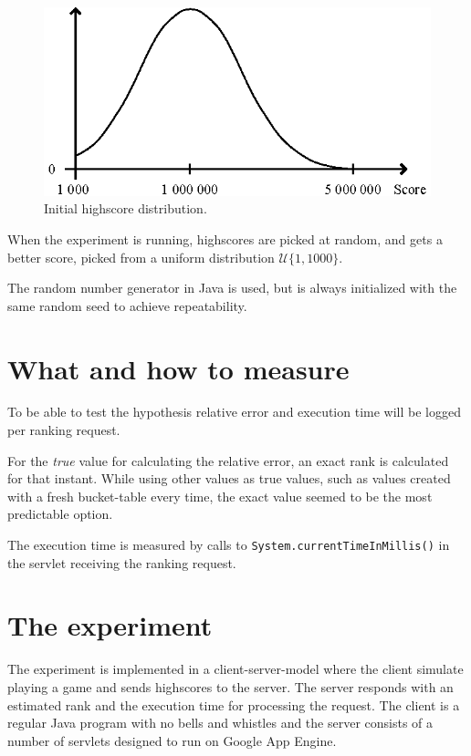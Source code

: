 \begin{figure}[h]
  \centering
  \caption{Initial highscore distribution.}
  \label{fig:highscore-distribution}
  \includegraphics[width=13cm]{img/highscore-distribution.eps}
\end{figure} 

When the experiment is running, highscores are picked at random, and gets a better score, picked from a uniform distribution $\mathcal{U}\{1, 1000\}$.

The random number generator in Java is used, but is always initialized with the same random seed to achieve repeatability.  

\section{What and how to measure}

To be able to test the hypothesis relative error and execution time will be logged per ranking request.

For the \emph{true} value for calculating the relative error, an exact rank is calculated for that instant. While using other values as true values, such as values created with a fresh bucket-table every time, the exact value seemed to be the most predictable option.

The execution time is measured by calls to \texttt{System.currentTimeInMillis()} in the servlet receiving the ranking request.

\section{The experiment}


The experiment is implemented in a client-server-model where the client simulate playing a game and sends highscores to the server. The server responds with an estimated rank and the execution time for processing the request. The client is a regular Java program with no bells and whistles and the server consists of a number of servlets designed to run on Google App Engine. 

